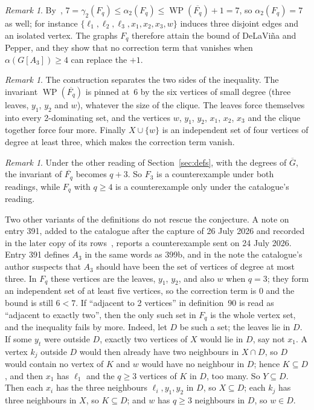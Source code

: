 \documentclass[11pt,a4paper]{article}
\theoremstyle{definition}
\theoremstyle{remark}
\newtheorem{remark}[theorem]{Remark}
\newcommand{\Gc}{\overline{G}}
\newcommand{\WP}{\operatorname{WP}}
\begin{document}
\begin{remark}\label{rem:tight}
By~\cite{dp12,favaron}, $7=\gamma_2(F_q)\le\alpha_2(F_q)\le\WP(\overline{F_q})+1=7$, so
$\alpha_2(F_q)=7$ as well; for instance $\{\ell_1,\ell_2,\ell_3,x_1,x_2,x_3,w\}$ induces three
disjoint edges and an isolated vertex. The graphs $F_q$ therefore attain the bound of DeLaVi\~na and
Pepper, and they show that no correction term that vanishes when $\alpha(G[A_3])\ge 4$ can replace
the $+1$.
\end{remark}

\begin{remark}\label{rem:why}
The construction separates the two sides of the inequality. The invariant $\WP(\overline{F_q})$
is pinned at~6 by the six vertices of small degree (three leaves, $y_1$, $y_2$ and $w$), whatever
the size of the clique. The leaves force themselves into every 2-dominating set, and the vertices
$w$, $y_1$, $y_2$, $x_1$, $x_2$, $x_3$ and the clique together force four more. Finally $X\cup\{w\}$ is an independent
set of four vertices of degree at least three, which makes the correction term vanish.
\end{remark}

\begin{remark}\label{rem:reading}
Under the other reading of Section~\ref{sec:defs}, with the degrees of $\Gc$, the invariant of
$\overline{F_q}$ becomes $q+3$. So $F_3$ is a counterexample under both readings, while $F_q$ with
$q\ge 4$ is a counterexample only under the catalogue's reading.

Two other variants of the definitions do not rescue the conjecture. A note on entry 391, added
to the catalogue after the capture of 26 July 2026 and recorded in the later copy of its
rows~\cite{aiv}, reports a counterexample sent on 24 July 2026. Entry 391 defines $A_3$ in the same
words as 399b, and in the note the catalogue's author suspects that $A_3$ should have been the set
of vertices of degree at most three. In $F_q$ these vertices are the
leaves, $y_1$, $y_2$, and also $w$ when $q=3$; they form an independent set of at least five
vertices, so the correction term is $0$ and the bound is still $6<7$. If ``adjacent to 2 vertices''
in definition~90 is read as ``adjacent to exactly two'', then the only such set in $F_q$ is the
whole vertex set, and the inequality fails by more. Indeed, let $D$ be such a set; the leaves lie
in $D$. If some $y_t$ were outside $D$, exactly two vertices of $X$ would lie in $D$, say not $x_1$.
A vertex $k_j$ outside $D$ would then already have two neighbours in $X\cap D$, so $D$ would contain
no vertex of $K$ and $w$ would have no neighbour in $D$; hence $K\subseteq D$, and then $x_1$ has
$\ell_1$ and the $q\ge 3$ vertices of $K$ in $D$, too many. So $Y\subseteq D$. Then each $x_i$ has
the three neighbours $\ell_i,y_1,y_2$ in $D$, so $X\subseteq D$; each $k_j$ has three neighbours in
$X$, so $K\subseteq D$; and $w$ has $q\ge 3$ neighbours in $D$, so $w\in D$.
\end{remark}
\end{document}
